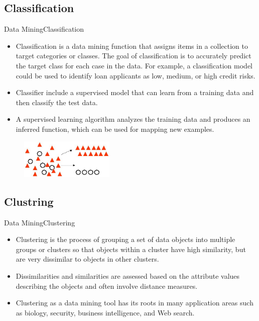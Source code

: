 \documentclass[10pt]{beamer}
\begin{document}
\subsection{Classification}
\begin{frame}{Data Mining}{Classification}
\begin{itemize}
\item Classification is a data mining function that assigns items in a collection to target categories or classes. The goal of classification is to accurately predict the target class for each case in the data. For example, a classification model could be used to identify loan applicants as low, medium, or high credit risks.

\item Classifier include a supervised model that can learn from a training data and then classify the test data.

\item A supervised learning algorithm analyzes the training data and produces an inferred function, which can be used for mapping new examples.

\end{itemize}
\begin{figure}[H]
	\centering
	\includegraphics[width=0.4\textwidth]{images/Classification.PNG}
	\label{fig:Classification}
\end{figure}

\end{frame}
\subsection{Clustring}
\begin{frame}{Data Mining}{Clustering}

\begin{itemize}
\item Clustering is the process of grouping a set of data objects into multiple groups or clusters
so that objects within a cluster have high similarity, but are very dissimilar to objects in
other clusters.
\item Dissimilarities and similarities are assessed based on the attribute values describing the
objects and often involve distance measures.
\item Clustering as a data mining tool has its roots in many application areas such as biology,
security, business intelligence, and Web search.
\end{itemize}

\end{frame}
\end{document}
